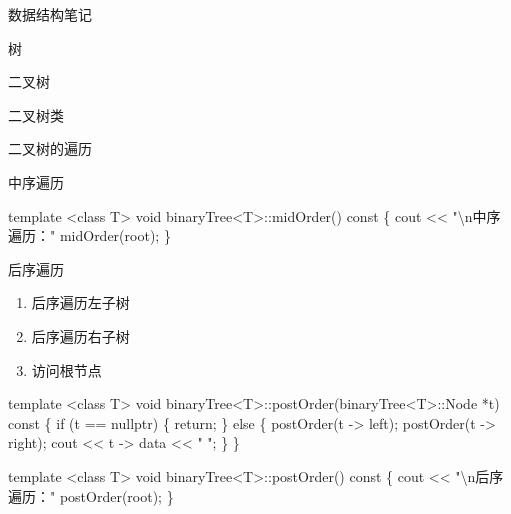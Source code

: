 \documentclass[
  ignorenonframetext,
]{beamer}
\newenvironment{Shaded}{}{}
\newcommand{\NormalTok}[1]{#1}
\providecommand{\tightlist}{%
  \setlength{\itemsep}{0pt}\setlength{\parskip}{0pt}}
\begin{document}
\begin{frame}[fragile]{数据结构笔记}
\begin{block}{树}
\begin{block}{二叉树}
\begin{block}{二叉树类}
\begin{block}{二叉树的遍历}
\begin{block}{中序遍历}
\begin{Shaded}
\begin{Highlighting}[]
\NormalTok{template \textless{}class T\textgreater{}}
\NormalTok{void binaryTree\textless{}T\textgreater{}::midOrder() const}
\NormalTok{\{}
\NormalTok{  cout \textless{}\textless{} "\textbackslash{}n中序遍历："}
\NormalTok{  midOrder(root);}
\NormalTok{\}}
\end{Highlighting}
\end{Shaded}
\end{block}

\begin{block}{后序遍历}
\protect{}\label{ux540eux5e8fux904dux5386-1}
\begin{enumerate}
\tightlist
\item
  后序遍历左子树
\item
  后序遍历右子树
\item
  访问根节点
\end{enumerate}

\begin{Shaded}
\begin{Highlighting}[]
\NormalTok{template \textless{}class T\textgreater{}}
\NormalTok{void binaryTree\textless{}T\textgreater{}::postOrder(binaryTree\textless{}T\textgreater{}::Node *t) const}
\NormalTok{\{}
\NormalTok{  if (t == nullptr)}
\NormalTok{  \{}
\NormalTok{    return;}
\NormalTok{  \}}
\NormalTok{  else}
\NormalTok{  \{}
\NormalTok{    postOrder(t {-}\textgreater{} left);}
\NormalTok{    postOrder(t {-}\textgreater{} right);}
\NormalTok{    cout \textless{}\textless{} t {-}\textgreater{} data \textless{}\textless{} " ";}
\NormalTok{  \}}
\NormalTok{\}}
\end{Highlighting}
\end{Shaded}

\begin{Shaded}
\begin{Highlighting}[]
\NormalTok{template \textless{}class T\textgreater{}}
\NormalTok{void binaryTree\textless{}T\textgreater{}::postOrder() const}
\NormalTok{\{}
\NormalTok{  cout \textless{}\textless{} "\textbackslash{}n后序遍历："}
\NormalTok{  postOrder(root);}
\NormalTok{\}}
\end{Highlighting}
\end{Shaded}
\end{block}
\end{block}


\end{block}
\end{block}
\end{block}
\end{frame}
\end{document}
